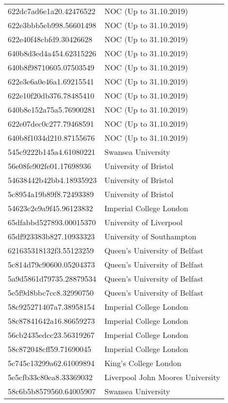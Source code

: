 \begin{tabular}{ll}
622dc7ad6e1a20.42476522 & NOC (Up to 31.10.2019) \\
622e3bbb5eb998.56601498 & NOC (Up to 31.10.2019) \\
622e40f48cbfd9.30426628 & NOC (Up to 31.10.2019) \\
640b8d3ed4a454.62315226 & NOC (Up to 31.10.2019) \\
640b8f98710605.07503549 & NOC (Up to 31.10.2019) \\
622e3e6a0e46a1.69215541 & NOC (Up to 31.10.2019) \\
622e10f20db376.78485410 & NOC (Up to 31.10.2019) \\
640b8e152a75a5.76900281 & NOC (Up to 31.10.2019) \\
622e07dec0c277.79468591 & NOC (Up to 31.10.2019) \\
640b8f1034d210.87155676 & NOC (Up to 31.10.2019) \\
545c9222b145a4.61080221 & Swansea University \\
56e08fe902fe01.17698936 & University of Bristol \\
54638442b42bb4.18935923 & University of Bristol \\
5c8954a19b89f8.72493389 & University of Bristol \\
54623c2e9a9f45.96123832 & Imperial College London \\
65dfabbd527893.00015370 & University of Liverpool \\
65df923383b827.10933323 & University of Southampton \\
621635318132f3.55123259 & Queen's University of Belfast \\
5c814d79c90600.05204373 & Queen's University of Belfast \\
5a9d5861d79735.28879534 & Queen's University of Belfast \\
5e5f9d8bbc7cc8.32990750 & Queen's University of Belfast \\
58c925271407a7.38958154 & Imperial College London \\
58c87841642a16.86659273 & Imperial College London \\
56cb2435edcc23.56319267 & Imperial College London \\
58c872048cff59.71690045 & Imperial College London \\
5c745c13299a62.61009894 & King's College London \\
5e5cfb33c80ea8.33369032 & Liverpool John Moores University \\
58c6b5b8579560.64005907 & Swansea University \\

\end{tabular}
